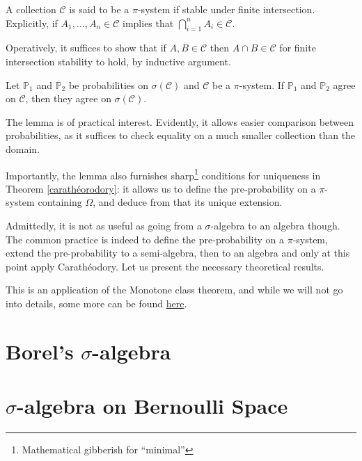 \begin{my_definition}[$\pi$-system]
	A collection $\mathcal{C}$ is said to be a $\pi$-system if stable under finite intersection. Explicitly, if $A_1, \dots, A_n \in \mathcal{C}$ implies that $\bigcap^n_{i=1} A_i \in \mathcal{C}$.
\end{my_definition}
\begin{my_remark}
	Operatively, it suffices to show that if $A,B \in \mathcal{C}$ then $A \cap B \in \mathcal{C}$ for finite intersection stability to hold, by inductive argument.
\end{my_remark}
\begin{my_lemma}
	Let $\mathbb{P}_1$ and $\mathbb{P}_2$ be probabilities on $\sigma(\mathcal{C})$ and $\mathcal{C}$ be a $\pi$-system. If $\mathbb{P}_1$ and $\mathbb{P}_2$ agree on $\mathcal{C}$, then they agree on $\sigma(\mathcal{C})$.
\end{my_lemma}
\begin{my_remark}
	The lemma is of practical interest. Evidently, it allows easier comparison between probabilities, as it suffices to check equality on a much smaller collection than the domain.
	
	Importantly, the lemma also furnishes sharp\footnote{Mathematical gibberish for ``minimal''} conditions for uniqueness in Theorem \ref{carathéorodory}: it allows us to define the pre-probability on a $\pi$-system containing $\Omega$, and deduce from that its unique extension.
\end{my_remark}
Admittedly, it is not as useful as going from a $\sigma$-algebra to an algebra though. The common practice is indeed to define the pre-probability on a $\pi$-system, extend the pre-probability to a semi-algebra, then to an algebra and only at this point apply Carathéodory. Let us present the necessary theoretical results.


This is an application of the Monotone class theorem, and while we will not go into details, some more can be found \href{http://theanalysisofdata.com/probability/E_3.html}{here}.



\section*{Borel's $\sigma$-algebra}

\section*{$\sigma$-algebra on Bernoulli Space}

